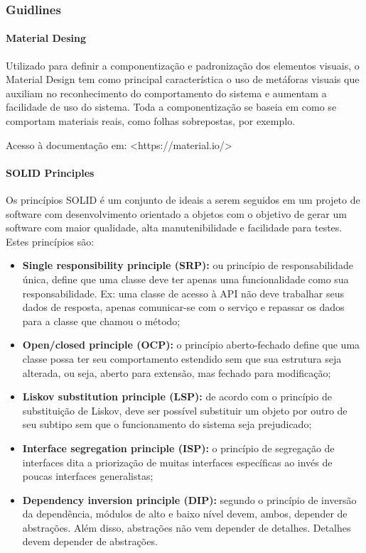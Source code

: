 \documentclass[	DIV=calc,%
							paper=a4,%
							fontsize=12pt,%
							onecolumn]{scrartcl}	 					%
\begin{document}
\subsubsection{Guidlines} 
\paragraph{Material Desing}
Utilizado para definir a componentização e padronização dos elementos visuais, o Material Design tem como principal característica o uso de metáforas visuais que auxiliam no reconhecimento do comportamento do sistema e aumentam a facilidade de uso do sistema. Toda a componentização se baseia em como se comportam materiais reais, como folhas sobrepostas, por exemplo.

Acesso à documentação em: <https://material.io/>

\paragraph{SOLID Principles}
Os princípios SOLID\cite{solid} é um conjunto de ideais a serem seguidos em um projeto de software com desenvolvimento orientado a objetos com o objetivo de gerar um software com maior qualidade, alta manutenibilidade e facilidade para testes. Estes princípios são:
\begin{itemize}
	\item \textbf{Single responsibility principle (SRP):} ou princípio de responsabilidade única, define que uma classe deve ter apenas uma funcionalidade como sua responsabilidade. Ex: uma classe de acesso à API não deve trabalhar seus dados de resposta, apenas comunicar-se com o serviço e repassar os dados para a classe que chamou o método;
	\item \textbf{Open/closed principle (OCP):} o princípio aberto-fechado define que uma classe possa ter seu comportamento estendido sem que sua estrutura seja alterada, ou seja, aberto para extensão, mas fechado para modificação;
	\item \textbf{Liskov substitution principle (LSP):} de acordo com o princípio de substituição de Liskov, deve ser possível substituir um objeto por outro de seu subtipo sem que o funcionamento do sistema seja prejudicado;
	\item \textbf{Interface segregation principle (ISP):} o princípio de segregação de interfaces dita a priorização de muitas interfaces específicas ao invés de poucas interfaces generalistas;
	\item \textbf{Dependency inversion principle (DIP):} segundo o princípio de inversão da dependência, módulos de alto e baixo nível devem, ambos, depender de abstrações. Além disso, abstrações não vem depender de detalhes. Detalhes devem depender de abstrações.
\end{itemize}
\end{document}
